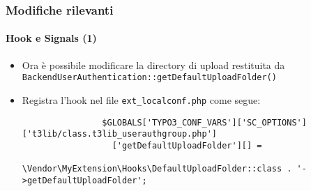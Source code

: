 \begin{frame}[fragile]
	\frametitle{Modifiche rilevanti}
	\framesubtitle{Hook e Signals (1)}

	\lstset{basicstyle=\tiny\ttfamily}

	\begin{itemize}

		\item Ora è possibile modificare la directory di upload restituita da
			\texttt{BackendUserAuthentication::getDefaultUploadFolder()}

		\item Registra l'hook nel file \texttt{ext\_localconf.php} come segue:

			\begin{lstlisting}
				$GLOBALS['TYPO3_CONF_VARS']['SC_OPTIONS']['t3lib/class.t3lib_userauthgroup.php']
				  ['getDefaultUploadFolder'][] =
				  \Vendor\MyExtension\Hooks\DefaultUploadFolder::class . '->getDefaultUploadFolder';
			\end{lstlisting}

	\end{itemize}

\end{frame}

